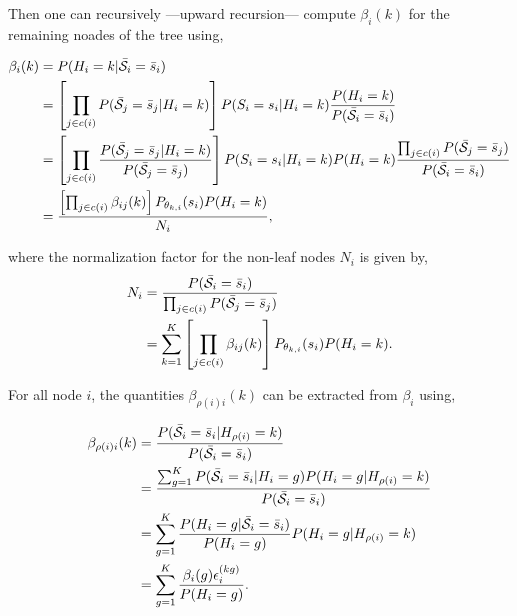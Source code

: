 \documentclass[a4paper,11pt]{report}
\begin{document}
				Then one can recursively ---upward recursion--- compute $\beta_{i}(k)$ for the remaining noades of the tree using,
				
				\begin{equation}
					\begin{split}
						\beta_{i}(k)	&= P(H_{i}=k | \bar{\mathcal{S}}_{i}= \bar{s}_{i})\\
													&= \left[ \prod_{j \in c(i)} P(\bar{\mathcal{S}}_{j}= \bar{s}_{j} | H_{i}=k) \right] P(S_{i}= s_{i} | H_{i}=k) \frac{P(H_{i}=k)} {P(\bar{\mathcal{S}}_{i}= \bar{s}_{i})}\\
													&= \left[ \prod_{j \in c(i)}  \frac{P(\bar{\mathcal{S}}_{j}= \bar{s}_{j} | H_{i}=k)} {P(\bar{\mathcal{S}}_{j}= \bar{s}_{j})} \right]
														P(S_{i}= s_{i} | H_{i}=k) P(H_{i}=k) 
														\frac{\prod_{j \in c(i)} P(\bar{\mathcal{S}}_{j}= \bar{s}_{j})} {P(\bar{\mathcal{S}}_{i}= \bar{s}_{i})}\\
													&= \frac{ \left[ \prod_{j \in c(i)} \beta_{ij}(k) \right] P_{\theta_{k,i}}(s_{i})P(H_{i}=k)}{N_{i}},
						\end{split}
						\label{eq:upward beta node}
				\end{equation}
				
				where the normalization factor for the non-leaf nodes $N_{i}$ is given by,
				\begin{equation}
					\begin{split}
						N_{i}	&= \frac{P(\bar{\mathcal{S}}_{i}= \bar{s}_{i})}{\prod_{j \in c(i)} P(\bar{\mathcal{S}}_{j}= \bar{s}_{j})}\\
									&= \sum_{k=1}^{K} \left[ \prod_{j \in c(i)} \beta_{ij}(k) \right]  P_{\theta_{k,i}}(s_{i})P(H_{i}=k).
					\end{split}
					\label{eq:upward normalization others}
				\end{equation}

				For all node $i$, the quantities $\beta_{\rho(i)i}(k)$ can be extracted from $\beta_{i}$ using,
				
				\begin{equation}
					\begin{split}
						\beta_{\rho(i)i}(k)	&= \frac{P(\bar{\mathcal{S}}_{i}= \bar{s}_{i} | H_{\rho(i)}=k)} {P(\bar{\mathcal{S}}_{i}= \bar{s}_{i}) }\\
																&= \frac{ \sum_{g=1}^{K} P(\bar{\mathcal{S}}_{i}= \bar{s}_{i} | H_{i}=g) P(H_{i}= g | H_{\rho(i)}=k)} {P(\bar{\mathcal{S}}_{i}= \bar{s}_{i}) }\\
																&= \sum_{g=1}^{K} \frac{ P(H_{i}=g | \bar{\mathcal{S}}_{i}= \bar{s}_{i})}{P(H_{i}=g)} P(H_{i}= g | H_{\rho(i)}=k)\\
																&= \sum_{g=1}^{K} \frac{\beta_{i}(g) \epsilon_{i}^{(kg)}}{P(H_{i}=g)}.
						\end{split}
						\label{eq:upward beta node and parents}
				\end{equation}
				
\end{document}
